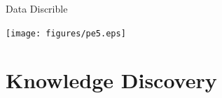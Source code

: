 \documentclass[
 size=14pt,
 paper=smartboard,  %
 mode=present, 		%
 display=slides, 	%
 style=tuliplab,  	%
 pauseslide,
 fleqn,leqno]{powerdot}
\begin{document}
\begin{slide}{Data Discrible}
	{\begin{flushleft}
			\texttt{[image: figures/pe5.eps]}
		\end{flushleft}
	}
\end{slide}



\section{Knowledge Discovery}
\end{document}
